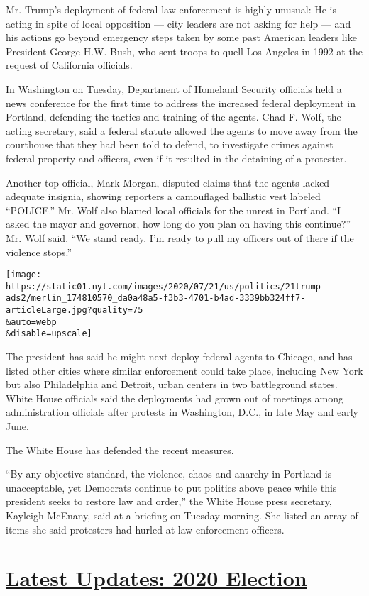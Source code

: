 Mr. Trump's deployment of federal law enforcement is highly unusual: He
is acting in spite of local opposition --- city leaders are not asking
for help --- and his actions go beyond emergency steps taken by some
past American leaders like President George H.W. Bush, who sent troops
to quell Los Angeles in 1992 at the request of California officials.

In Washington on Tuesday, Department of Homeland Security officials held
a news conference for the first time to address the increased federal
deployment in Portland, defending the tactics and training of the
agents. Chad F. Wolf, the acting secretary, said a federal statute
allowed the agents to move away from the courthouse that they had been
told to defend, to investigate crimes against federal property and
officers, even if it resulted in the detaining of a protester.

Another top official, Mark Morgan, disputed claims that the agents
lacked adequate insignia, showing reporters a camouflaged ballistic vest
labeled ``POLICE.'' Mr. Wolf also blamed local officials for the unrest
in Portland. ``I asked the mayor and governor, how long do you plan on
having this continue?'' Mr. Wolf said. ``We stand ready. I'm ready to
pull my officers out of there if the violence stops.''

\texttt{[image: https://static01.nyt.com/images/2020/07/21/us/politics/21trump-ads2/merlin\_174810570\_da0a48a5-f3b3-4701-b4ad-3339bb324ff7-articleLarge.jpg?quality=75\\\&auto=webp\\\&disable=upscale]}

The president has said he might next deploy federal agents to Chicago,
and has listed other cities where similar enforcement could take place,
including New York but also Philadelphia and Detroit, urban centers in
two battleground states. White House officials said the deployments had
grown out of meetings among administration officials after protests in
Washington, D.C., in late May and early June.

The White House has defended the recent measures.

``By any objective standard, the violence, chaos and anarchy in Portland
is unacceptable, yet Democrats continue to put politics above peace
while this president seeks to restore law and order,'' the White House
press secretary, Kayleigh McEnany, said at a briefing on Tuesday
morning. She listed an array of items she said protesters had hurled at
law enforcement officers.

\hypertarget{latest-updates-2020-election}{%
\section{\texorpdfstring{\href{https://www.nytimes.com/2020/07/31/us/elections/biden-vs-trump.html?action=click\&pgtype=Article\&state=default\&region=MAIN_CONTENT_1\&context=storylines_live_updates}{Latest
Updates: 2020
Election}}{Latest Updates: 2020 Election}}\label{latest-updates-2020-election}}

